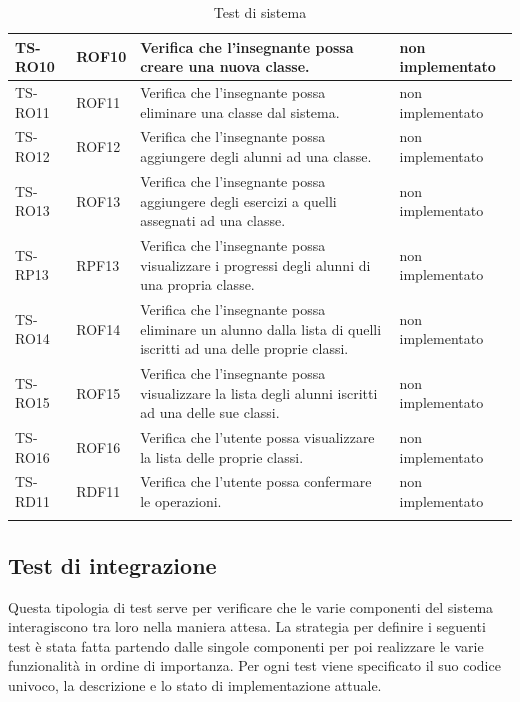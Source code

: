 {\begin{longtable}{|>{\centering\arraybackslash}m{1.6cm}|>{\centering\arraybackslash}m{1.7cm}|m{6.41cm}|>{\centering\arraybackslash}m{3.1cm}|}
		\rowcolor{white}
		TS-RO10	
		& ROF10 
		& Verifica che l'insegnante possa creare una nuova classe. 
		& non implementato\\ \hline
		\rowcolor{LightGray}
		TS-RO11	
		& ROF11 
		& Verifica che l'insegnante possa eliminare una classe dal sistema. 
		& non implementato\\ \hline
		\rowcolor{white}
		TS-RO12
		& ROF12 
		& Verifica che l'insegnante possa aggiungere degli alunni ad una classe. 
		& non implementato\\ \hline
		\rowcolor{LightGray}
		TS-RO13
		& ROF13 
		& Verifica che l'insegnante possa aggiungere degli esercizi a quelli assegnati ad una classe. 
		& non implementato\\ \hline
		\rowcolor{white}
		TS-RP13
		& RPF13 
		& Verifica che l'insegnante possa visualizzare i progressi degli alunni di una propria classe.
		& non implementato\\ \hline
		\rowcolor{LightGray}
		TS-RO14
		& ROF14 
		& Verifica che l'insegnante possa eliminare un alunno dalla lista di quelli iscritti ad una delle proprie classi. 
		& non implementato\\ \hline
		\rowcolor{white}
		TS-RO15	
		& ROF15 
		& Verifica che l'insegnante possa visualizzare la lista degli alunni iscritti ad una delle sue classi. 
		& non implementato\\ \hline
		\rowcolor{LightGray}
		TS-RO16
		& ROF16 
		& Verifica che l'utente possa visualizzare la lista delle proprie classi. 
		& non implementato\\ \hline
		\rowcolor{white}
		TS-RD11	
		& RDF11 
		& Verifica che l'utente possa confermare le operazioni.
		& non implementato\\ \hline
		
		\caption{Test di sistema}
\end{longtable}}

\subsection{Test di integrazione}
Questa tipologia di test serve per verificare che le varie componenti del sistema interagiscono tra loro nella maniera attesa. La strategia per definire i seguenti test è stata fatta partendo dalle singole componenti per poi realizzare le varie funzionalità in ordine di importanza. Per ogni test viene specificato il suo codice univoco, la descrizione e lo stato di implementazione attuale.

